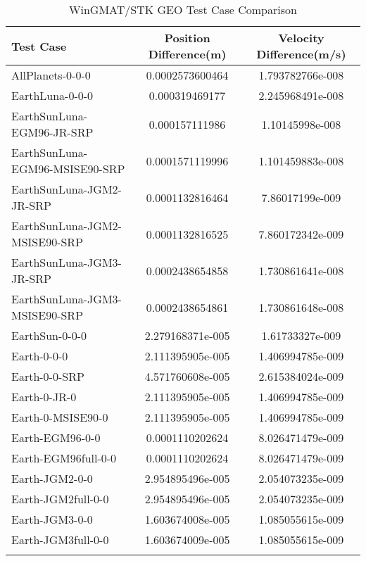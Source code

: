 \begin{table}[htbp!]
\centering
\caption{ WinGMAT/STK GEO Test Case Comparison}
      \begin{tabular}{lcc}
      \hline\hline
          Test Case & Position Difference(m) & Velocity Difference(m/s) \\
         \hline
         AllPlanets-0-0-0 & 0.0002573600464 & 1.793782766e-008 \\
         EarthLuna-0-0-0 & 0.000319469177 & 2.245968491e-008 \\
         EarthSunLuna-EGM96-JR-SRP & 0.000157111986 & 1.10145998e-008 \\
         EarthSunLuna-EGM96-MSISE90-SRP & 0.0001571119996 & 1.101459883e-008 \\
         EarthSunLuna-JGM2-JR-SRP & 0.0001132816464 & 7.86017199e-009 \\
         EarthSunLuna-JGM2-MSISE90-SRP & 0.0001132816525 & 7.860172342e-009 \\
         EarthSunLuna-JGM3-JR-SRP & 0.0002438654858 & 1.730861641e-008 \\
         EarthSunLuna-JGM3-MSISE90-SRP & 0.0002438654861 & 1.730861648e-008 \\
         EarthSun-0-0-0 & 2.279168371e-005 & 1.61733327e-009 \\
         Earth-0-0-0 & 2.111395905e-005 & 1.406994785e-009 \\
         Earth-0-0-SRP & 4.571760608e-005 & 2.615384024e-009 \\
         Earth-0-JR-0 & 2.111395905e-005 & 1.406994785e-009 \\
         Earth-0-MSISE90-0 & 2.111395905e-005 & 1.406994785e-009 \\
         Earth-EGM96-0-0 & 0.0001110202624 & 8.026471479e-009 \\
         Earth-EGM96full-0-0 & 0.0001110202624 & 8.026471479e-009 \\
         Earth-JGM2-0-0 & 2.954895496e-005 & 2.054073235e-009 \\
         Earth-JGM2full-0-0 & 2.954895496e-005 & 2.054073235e-009 \\
         Earth-JGM3-0-0 & 1.603674008e-005 & 1.085055615e-009 \\
         Earth-JGM3full-0-0 & 1.603674009e-005 & 1.085055615e-009 \\
      \hline\hline
      \label{Table: GEO WinGMAT-STK Table} 
\end{tabular}
\end{table}
